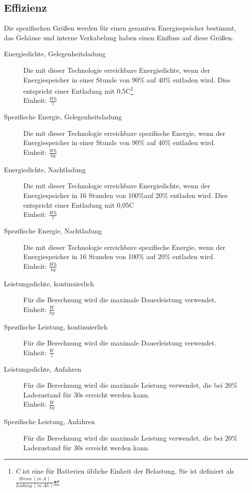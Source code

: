 \subsection{Effizienz}
Die spezifischen Größen werden für einen gesamten Energiespeicher bestimmt, das Gehäuse und interne Verkabelung haben einen Einfluss auf diese Größen.
\begin{description}
	\item[Energiedichte, Gelegenheitsladung] Die mit dieser Technologie erreichbare Energiedichte, wenn der Energiespeicher in einer Stunde von 90\% auf 40\% entladen wird. Dies entspricht einer Entladung mit 0,5C\footnote{\emph{C} ist eine für Batterien übliche Einheit der Belastung. Sie ist definiert als $\frac{Strom\ (in\ A)}{Ladung\ (in\ Ah)}$}\\
	Einheit: $\frac{Wh}{l}$ 
	\item[Spezifische Energie, Gelegenheitsladung] Die mit dieser Technologie erreichbare spezifische Energie, wenn der Energiespeicher in einer Stunde von 90\% auf 40\% entladen wird.\\
	Einheit: $\frac{Wh}{kg}$
	\item[Energiedichte, Nachtladung] Die mit dieser Technologie erreichbare Energiedichte, wenn der Energiespeicher in 16 Stunden von 100\%auf 20\% entladen wird. Dies entspricht einer Entladung mit 0,05C\\
	Einheit: $\frac{Wh}{l}$
	\item[Spezifische Energie, Nachtladung] Die mit dieser Technologie erreichbare spezifische Energie, wenn der Energiespeicher in 16 Stunden von 100\% auf 20\% entladen wird.\\
	Einheit: $\frac{Wh}{kg}$
	\item[Leistungsdichte, kontinuierlich] Für die Berechnung wird die maximale Dauerleistung verwendet.\\
	Einheit: $\frac{W}{kg}$
	\item[Spezifische Leistung, kontinuierlich] Für die Berechnung wird die maximale Dauerleistung verwendet.\\
	Einheit: $\frac{W}{l}$
	\item[Leistungsdichte, Anfahren] Für die Berechnung wird die maximale Leistung verwendet, die bei 20\% Ladezustand für 30s erreicht werden kann.\\
	Einheit: $\frac{W}{kg}$
	\item[Spezifische Leistung, Anfahren] Für die Berechnung wird die maximale Leistung verwendet, die bei 20\% Ladezustand für 30s erreicht werden kann.\\

\end{description}
